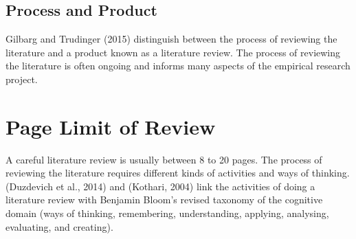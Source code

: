 \subsection{Process and Product}
Gilbarg and Trudinger (2015) distinguish between the process of reviewing the literature 
and a product known as a literature review. The process of reviewing the literature is 
often ongoing and informs many aspects of the empirical research project.

\section{Page Limit of Review}
A careful literature review is usually between 8 to 20 pages. The process of reviewing 
the literature requires different kinds of activities and ways of thinking. 
(Duzdevich et al., 2014) and (Kothari, 2004) link the activities of doing a literature review 
with Benjamin Bloom’s revised taxonomy of the cognitive domain (ways of thinking, 
remembering, understanding, applying, analysing, evaluating, and creating).